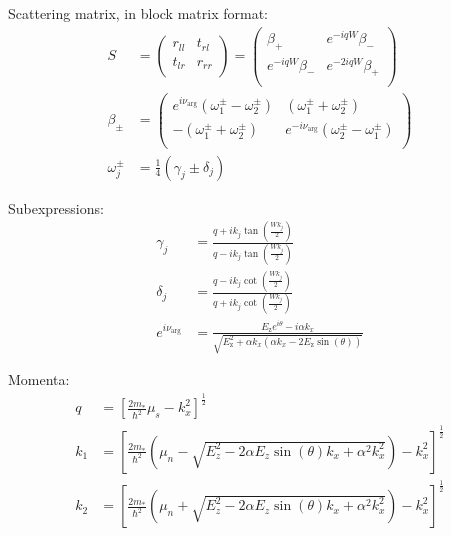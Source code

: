 			Scattering matrix, in block matrix format:
			\begin{align}
			\label{eq:smatrix}
		    S &= \left(
		    \begin{array}{rr}
		    r_{ll}&t_{rl}\\
		    t_{lr}&r_{rr}\\
		    \end{array}
		    \right) =
		    \left(
		    \begin{array}{rr}
		    \beta_+ & e^{-i q W} \beta_-\\
		    e^{-i q W} \beta_- & e^{-2 i q W} \beta_+\\
		    \end{array}
		    \right)
		    \\
		    \beta_\pm &= \left(
		    \begin{array}{rr}
		    e^{i \nu_{\arg}}\left(\omega^\pm_1 - \omega^\pm_2\right) & (\omega^\pm _1 + \omega^\pm _2)\\
		    -(\omega^\pm _1 + \omega^\pm _2) & e^{-i \nu _{\arg }} \left(\omega^\pm _2 - \omega^\pm _1\right)\\
		    \end{array}
		    \right)\\
		    \omega^\pm_j &= \frac{1}{4} \left(\gamma _{j} \pm \delta _{j}\right)
			\end{align}

			Subexpressions:
			\begin{align}
			    \gamma_j &= \frac{q+i k_{j} \tan \left(\frac{W k_{j}}{2}\right)}{q-i k_{j} \tan \left(\frac{W k_{j}}{2}\right)} \\
			    \delta_j &= \frac{q-i k_{j} \cot \left(\frac{W k_{j}}{2}\right)}{q+i k_{j} \cot \left(\frac{W k_{j}}{2}\right)}\\
			    e^{i \nu_{\arg}} &= \frac{E_\text{z} e^{i \theta }-i \alpha  k_x}{\sqrt{E_\text{z}^2+\alpha  k_x \left(\alpha  k_x-2 E_\text{z} \sin (\theta )\right)}}
			\end{align}

			Momenta:
			\begin{align}
			    q &= \left[ \frac{2 m_\ast}{\hbar ^2}\mu_s - k_x^2 \right]^\frac{1}{2}\\
			    k_1 &= \left[ \frac{2 m_\ast}{\hbar^2} \left(\mu_n-\sqrt{E_z^2-2 \alpha  E_z \sin (\theta ) k_x+\alpha ^2 k_x^2}\right) - k_x^2 \right]^\frac{1}{2}\\
			    k_2 &= \left[ \frac{2 m_\ast}{\hbar^2} \left(\mu_n+\sqrt{E_z^2-2 \alpha  E_z \sin (\theta ) k_x+\alpha ^2 k_x^2}\right) - k_x^2 \right]^\frac{1}{2}
			\label{eq:momenta_short_junction}
			\end{align}

